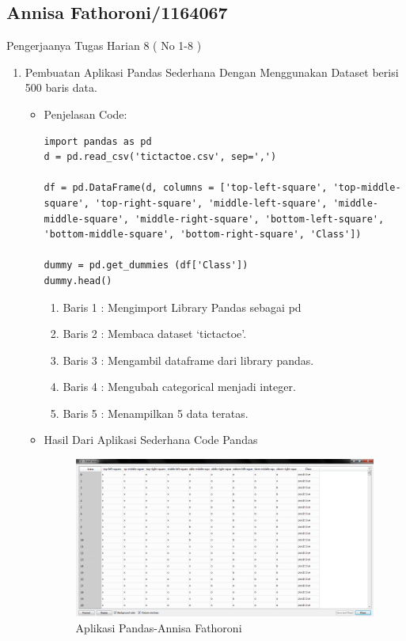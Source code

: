 \subsection{Annisa Fathoroni/1164067}
Pengerjaanya Tugas Harian 8 ( No 1-8 )
\begin{enumerate}
\item Pembuatan Aplikasi Pandas Sederhana Dengan Menggunakan Dataset berisi 500 baris data.
\begin{itemize}
\item Penjelasan Code:

\begin{verbatim}
import pandas as pd
d = pd.read_csv('tictactoe.csv', sep=',')

df = pd.DataFrame(d, columns = ['top-left-square', 'top-middle-square', 'top-right-square', 'middle-left-square', 'middle-middle-square', 'middle-right-square', 'bottom-left-square', 'bottom-middle-square', 'bottom-right-square', 'Class'])

dummy = pd.get_dummies (df['Class'])
dummy.head()
\end{verbatim}

\begin{enumerate}
\item Baris 1 : Mengimport Library Pandas sebagai pd
\item Baris 2 : Membaca dataset ‘tictactoe’.
\item Baris 3 : Mengambil dataframe dari library pandas.
\item Baris 4 : Mengubah categorical menjadi integer.
\item Baris 5 : Menampilkan 5 data teratas.
\end{enumerate}
\item Hasil Dari Aplikasi Sederhana Code Pandas

\begin{figure}[!hbtp]
\centering
\includegraphics[scale=0.3]{figures/Chapter4AnnisaFathoroni20.png}
\caption{Aplikasi Pandas-Annisa Fathoroni}
\label{Aplikasi Pandas-Annisa Fathoroni}
\end{figure}


\end{itemize}
\end{enumerate}
